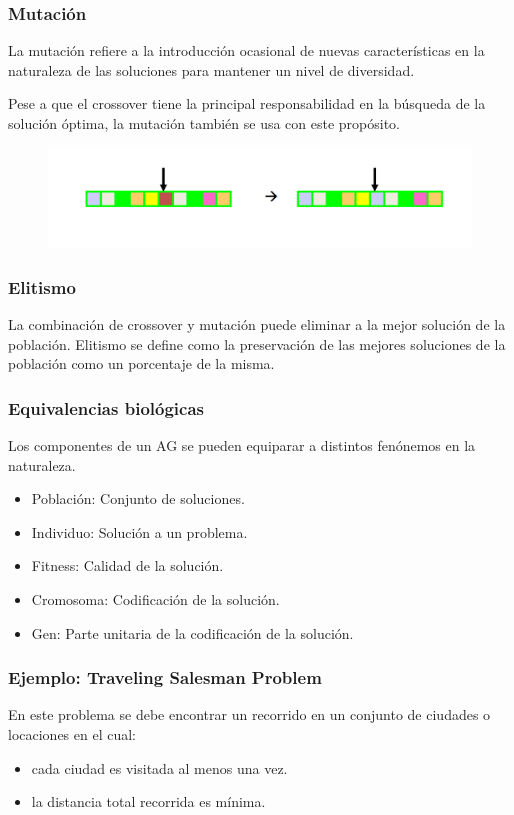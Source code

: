 \documentclass[10pt]{beamer}
\begin{document}
\begin{frame}
  \frametitle{Mutación}

  La mutación refiere a la introducción ocasional de nuevas características en 
  la naturaleza de las soluciones para mantener un nivel de diversidad.

  Pese a que el crossover tiene la principal responsabilidad en la búsqueda de 
  la solución óptima, la mutación también se usa con este propósito.
  \begin{figure}[!h] 
    \centering
    \includegraphics[width=1\textwidth]{img/mut}
  \end{figure}

\end{frame}

\begin{frame}
  \frametitle{Elitismo}

  La combinación de crossover y mutación puede eliminar a la mejor solución de 
  la población. Elitismo se define como la preservación de las mejores soluciones de 
  la población como un porcentaje de la misma.

\end{frame}

\begin{frame}
  \frametitle{Equivalencias biológicas}

  Los componentes de un AG se pueden equiparar a distintos fenónemos en la naturaleza.

  \begin{itemize}
    \item Población: Conjunto de soluciones.
    \item Individuo: Solución a un problema.
    \item Fitness: Calidad de la solución.
    \item Cromosoma: Codificación de la solución.
    \item Gen: Parte unitaria de la codificación de la solución.
  \end{itemize}

\end{frame}

\begin{frame}
  \frametitle{Ejemplo: Traveling Salesman Problem}

  En este problema se debe encontrar un recorrido en un conjunto de ciudades 
  o locaciones en el cual:
  
  \begin{itemize}
    \item cada ciudad es visitada al menos una vez.
    \item la distancia total recorrida es mínima.
  \end{itemize}

\end{frame}
\end{document}
